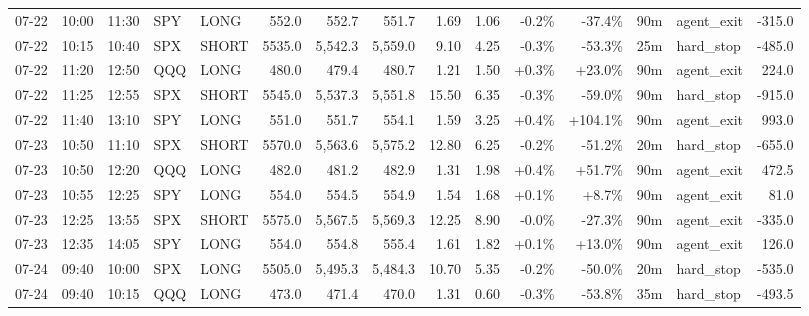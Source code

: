 \documentclass[11pt,a4paper,twoside]{article}
\begin{document}
\begin{landscape}
\begin{center}
\begin{longtable}{>{\color{txtmain}}l l l l l r r r r r r r r >{\color{txtmain}}l r}
07-22 & 10:00 & 11:30 & SPY & LONG & 552.0 & 552.7 & 551.7 & 1.69 & 1.06 & \textcolor{lossred}{-0.2\%} & \textcolor{lossred}{-37.4\%} & 90m & agent\_exit & \textcolor{lossred}{-315.0} \\
07-22 & 10:15 & 10:40 & SPX & SHORT & 5535.0 & 5,542.3 & 5,559.0 & 9.10 & 4.25 & \textcolor{lossred}{-0.3\%} & \textcolor{lossred}{-53.3\%} & 25m & hard\_stop & \textcolor{lossred}{-485.0} \\
07-22 & 11:20 & 12:50 & QQQ & LONG & 480.0 & 479.4 & 480.7 & 1.21 & 1.50 & \textcolor{wingreen}{+0.3\%} & \textcolor{wingreen}{+23.0\%} & 90m & agent\_exit & \textcolor{wingreen}{224.0} \\
07-22 & 11:25 & 12:55 & SPX & SHORT & 5545.0 & 5,537.3 & 5,551.8 & 15.50 & 6.35 & \textcolor{lossred}{-0.3\%} & \textcolor{lossred}{-59.0\%} & 90m & hard\_stop & \textcolor{lossred}{-915.0} \\
07-22 & 11:40 & 13:10 & SPY & LONG & 551.0 & 551.7 & 554.1 & 1.59 & 3.25 & \textcolor{wingreen}{+0.4\%} & \textcolor{wingreen}{+104.1\%} & 90m & agent\_exit & \textcolor{wingreen}{993.0} \\
07-23 & 10:50 & 11:10 & SPX & SHORT & 5570.0 & 5,563.6 & 5,575.2 & 12.80 & 6.25 & \textcolor{lossred}{-0.2\%} & \textcolor{lossred}{-51.2\%} & 20m & hard\_stop & \textcolor{lossred}{-655.0} \\
07-23 & 10:50 & 12:20 & QQQ & LONG & 482.0 & 481.2 & 482.9 & 1.31 & 1.98 & \textcolor{wingreen}{+0.4\%} & \textcolor{wingreen}{+51.7\%} & 90m & agent\_exit & \textcolor{wingreen}{472.5} \\
07-23 & 10:55 & 12:25 & SPY & LONG & 554.0 & 554.5 & 554.9 & 1.54 & 1.68 & \textcolor{wingreen}{+0.1\%} & \textcolor{wingreen}{+8.7\%} & 90m & agent\_exit & \textcolor{wingreen}{81.0} \\
07-23 & 12:25 & 13:55 & SPX & SHORT & 5575.0 & 5,567.5 & 5,569.3 & 12.25 & 8.90 & \textcolor{lossred}{-0.0\%} & \textcolor{lossred}{-27.3\%} & 90m & agent\_exit & \textcolor{lossred}{-335.0} \\
07-23 & 12:35 & 14:05 & SPY & LONG & 554.0 & 554.8 & 555.4 & 1.61 & 1.82 & \textcolor{wingreen}{+0.1\%} & \textcolor{wingreen}{+13.0\%} & 90m & agent\_exit & \textcolor{wingreen}{126.0} \\
07-24 & 09:40 & 10:00 & SPX & LONG & 5505.0 & 5,495.3 & 5,484.3 & 10.70 & 5.35 & \textcolor{lossred}{-0.2\%} & \textcolor{lossred}{-50.0\%} & 20m & hard\_stop & \textcolor{lossred}{-535.0} \\
07-24 & 09:40 & 10:15 & QQQ & LONG & 473.0 & 471.4 & 470.0 & 1.31 & 0.60 & \textcolor{lossred}{-0.3\%} & \textcolor{lossred}{-53.8\%} & 35m & hard\_stop & \textcolor{lossred}{-493.5} \\

\end{longtable}
\end{center}
\end{landscape}
\end{document}

